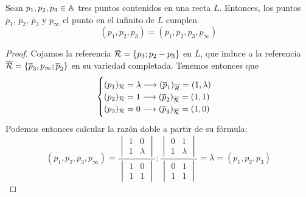 \begin{prop}
  Sean $p_1, p_2, p_3 \in \mathbb{A}$ tres puntos contenidos en una recta $L$. Entonces,
  los puntos $\overline{p}_1, \, \overline{p}_2, \, \overline{p}_3$ 
  y $p_\infty$ el punto en el infinito de $L$ cumplen
  \[(p_1, p_2, p_3) = (\overline{p}_1, \overline{p}_2, \overline{p}_3, p_\infty)\]
\end{prop}

\begin{proof}
  Cojamos la referencia $\mathcal{R} = \{ p_3; p_2-p_3\}$ en $L$, que induce a la referencia
  $\overline{\mathcal{R}} = \{\overline{p}_3, p_\infty; \overline{p}_2\}$ en su variedad completada. 
  Tenemos entonces que 
  \[
    \begin{cases}
      (p_1)_{\mathcal{R}} = \lambda \longrightarrow (\overline{p}_1)_{\overline{\mathcal{R}}} = (1, \lambda) \\
      (p_2)_{\mathcal{R}} = 1 \longrightarrow (\overline{p}_2)_{\overline{\mathcal{R}}} = (1, 1) \\
      (p_3)_{\mathcal{R}} = 0 \longrightarrow (\overline{p}_3)_{\overline{\mathcal{R}}} = (1, 0) 
    \end{cases}
  \]
  Podemos entonces calcular la razón doble a partir de su fórmula:
    \[
      (\overline{p}_1, \overline{p}_2, \overline{p}_3, p_\infty) = 
      \frac{
        \begin{vmatrix}
          1 & 0 \\ 1 & \lambda 
        \end{vmatrix}
      }
      {
        \begin{vmatrix}
        1 & 0 \\
        1 & 1
    \end{vmatrix}
  }
    :
    \frac{
        \begin{vmatrix}
          0 & 1 \\ 1 & \lambda 
        \end{vmatrix}
      }
      {
        \begin{vmatrix}
        0 & 1 \\
        1 & 1
    \end{vmatrix}
  }
  = \lambda = (p_1, p_2, p_3)
\]
\end{proof}

